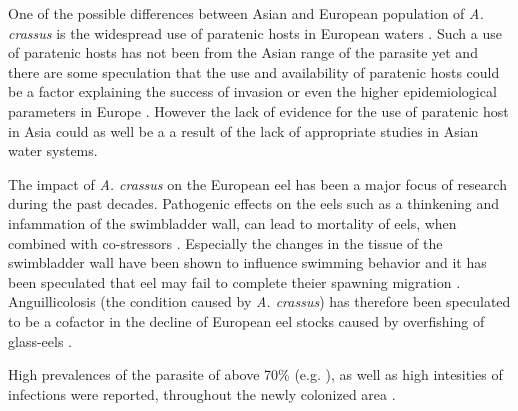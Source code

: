 
One of the possible differences between Asian and European population
of \textit{A. crassus} is the widespread use of paratenic hosts in
European waters
\cite{thomas_paratenic_1992,pietrock_dynamics_2002}. Such a use of
paratenic hosts has not been from the Asian range of the parasite yet
and there are some speculation that the use and availability of
paratenic hosts could be a factor explaining the success of invasion
or even the higher epidemiological parameters in Europe
\cite{thomas_paratenic_1992}. However the lack of evidence for the use
of paratenic host in Asia could as well be a a result of the lack of
appropriate studies in Asian water systems.

The impact of \textit{A. crassus} on the European eel has been a major
focus of research during the past decades. Pathogenic effects on the
eels such as a thinkening \cite{wurtz_tara_2000} and infammation
\cite{beregi_radiodiagnostic_1998} of the swimbladder wall, can lead
to mortality of eels, when combined with co-stressors
\cite{gollock_physiological_2005}. Especially the changes in the
tissue of the swimbladder wall have been shown to influence swimming
behavior and it has been speculated that eel may fail to complete
theier spawning migration
\cite{palstra_swimming_2007}. Anguillicolosis (the condition caused by
\textit{A. crassus}) has therefore been speculated to be a cofactor in
the decline of European eel stocks \cite{sures_science_letter} caused
by overfishing of glass-eels \cite{pmid12713741}.

High prevalences of the parasite of above 70\%
(e.g. \cite{wrtz_distribution_1998}), as well as high intesities of
infections were reported, throughout the newly colonized area
\cite{lefebvre_anguillicolosis:_2004}.

